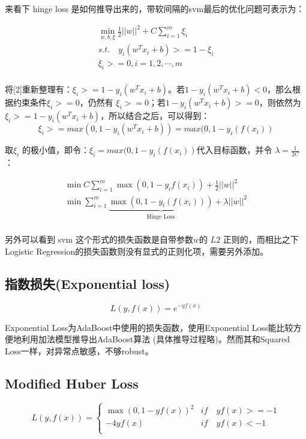 \documentclass[12pt]{article}
\begin{document}
来看下 hinge loss 是如何推导出来的，带软间隔的svm最后的优化问题可表示为：

\begin{equation}
\begin{split}
    \min_{w,b,\xi}\frac{1}{2}||w||^2+C\sum_{i=1}^m{\xi_i} \\
    s.t. \quad y_i(w^Tx_i+b) >= 1 - \xi_i\\
    \xi_i >= 0, i = 1, 2, \cdots, m\\
\end{split}
\end{equation}

将[2]重新整理有：$\xi_i >= 1 - y_i(w^Tx_i+b)$。若$1 - y_i(w^Tx_i+b)<0$，那么根据约束条件$\xi_i >= 0$，仍然有 $\xi_i >= 0$；若$1 - y_i(w^Tx_i+b)>=0$，则依然为$\xi_i >= 1 - y_i(w^Tx_i+b)$，所以结合之后，可以得到：
$$
\xi_i >= max(0, 1-y_i(w^Tx_i+b)) = max(0, 1-y_i(f(x_i))
$$

取$\xi_i$ 的极小值，即令：$\xi_i=max(0, 1-y_i(f(x_i))$代入目标函数，并令 $\lambda = \frac{1}{2C}$：

\begin{equation}
\begin{split}
    \min{C}\sum_{i=1}^{m}\max{(0, 1-y_if(x_i))} + \frac{1}{2}||w||^2 \\
    \min{\sum_{i=1}^m\underbrace{\max{(0,1-y_i(f(x_i)))}}_{\text{Hinge Loss}}}
     + \lambda||w||^2 \\
\end{split}
\end{equation}

另外可以看到 svm 这个形式的损失函数是自带参数$w$的 $L2$ 正则的，而相比之下Logistic Regression的损失函数则没有显式的正则化项，需要另外添加。

\subsection{指数损失(Exponential loss)}
$$
L(y,f(x))=e^{-yf(x)}
$$

Exponential Loss为AdaBoost中使用的损失函数，使用Exponential Loss能比较方便地利用加法模型推导出AdaBoost算法 (具体推导过程略)。然而其和Squared Loss一样，对异常点敏感，不够robust。

\subsection{Modified Huber Loss}
$$L(y,f(x))= \begin{cases}
\max{(0, 1-yf(x))^2} & if \quad yf(x) >= -1 \\
-4yf(x) & if \quad yf(x) < -1 \\
\end{cases}$$
\end{document}
